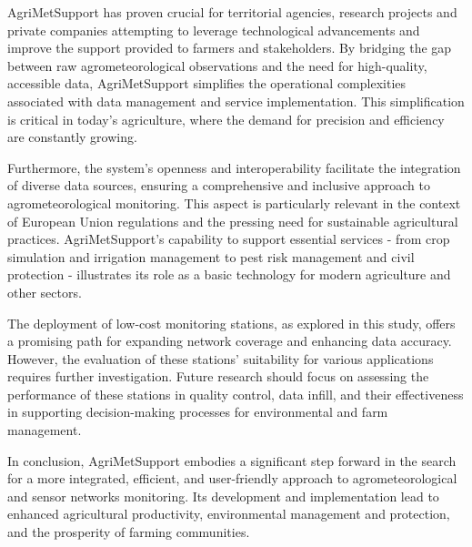 \documentclass[authoryear,preprint,review,12pt]{elsarticle}
\newcommand{\note}[1]{\emph{\textcolor{red}{#1}}}
\begin{document}
AgriMetSupport has proven crucial 
for territorial agencies, research pro\-jects and private companies attempting
to leverage technological advancements and improve the support provided to farmers and stakeholders. 
By bridging the gap between raw agrometeorological observations and the need for high-quality, accessible data, AgriMetSupport simplifies the operational complexities associated with data management and service implementation. 
This simplification is critical in today's agriculture, where the demand for precision and efficiency are constantly growing.

Furthermore, the system's openness and interoperability facilitate the integration of diverse data sources, ensuring a comprehensive and inclusive approach to agrometeorological monitoring. This aspect is particularly relevant in the context of European Union regulations and the pressing need for sustainable agricultural practices.
AgriMetSupport's capability to support essential services - from crop simulation and irrigation management to pest risk management and civil protection - illustrates its role as a basic technology for modern agriculture and other sectors.

The deployment of low-cost monitoring stations, as explored in this study, offers a promising path for expanding network coverage and enhancing data accuracy.
However, the evaluation of these stations' suitability for various applications requires further investigation.
Future research should focus on assessing the performance of these stations in quality control, data infill, and their effectiveness in supporting decision-making processes for environmental and farm management.

In conclusion, AgriMetSupport embodies a significant step forward in the search for a more integrated, efficient, and user-friendly approach to agrometeorological and sensor networks monitoring.
Its development and implementation lead to enhanced agricultural productivity, environmental management and protection, and the prosperity of farming communities. %


\end{document}
